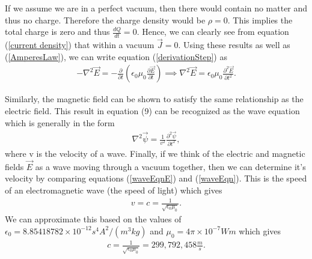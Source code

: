 If we assume we are in a perfect vacuum, then there would contain no matter and thus no charge. Therefore the charge density would be $\rho=0$. This implies the total charge is zero and thus $\frac{dQ}{dt}=0$. Hence, we can clearly see from equation (\ref{current density}) that within a vacuum $\vec{J}=0$. Using these results as well as (\ref{AmperesLaw}), we can write equation (\ref{derivationStep}) as
\begin{align}
	-\nabla^2\vec{E} = -\frac{\partial}{\partial t}\left(\epsilon_0\mu_0\frac{\partial \vec{E}}{\partial t}\right) \implies \nabla^2\vec{E} = \epsilon_0\mu_0\frac{\partial^2 \vec{E}}{\partial t^2}. \label{waveEqnE}
\end{align}

Similarly, the magnetic field can be shown to satisfy the same relationship as the electric field. This result in equation (9) can be recognized as the wave equation which is generally in the form
\begin{align}
	\nabla^2\vec{\psi} = \frac{1}{v^2}\frac{\partial^2 \vec{\psi}}{\partial t^2},\label{waveEqn}
\end{align}
where v is the velocity of a wave. Finally, if we think of the electric and magnetic fields $\vec{E}$ as a wave moving through a vacuum together, then we can determine it's velocity by comparing equations (\ref{waveEqnE}) and (\ref{waveEqn}). This is the speed of an electromagnetic wave (the speed of light) which gives
\begin{align}
	v=c=\frac{1}{\sqrt{\epsilon_0\mu_0}}.
\end{align}
We can approximate this based on the values of $\epsilon_0 = 8.85418782 \times 10^{-12}  s^4 A^2/(m^3 kg)$ and $\mu_0 =4\pi \times 10^{-7} Wm$ which gives
\begin{align}
	c=\frac{1}{\sqrt{\epsilon_0\mu_0}} = \boxed{299,792,458 \frac{m}{s}}.
\end{align}